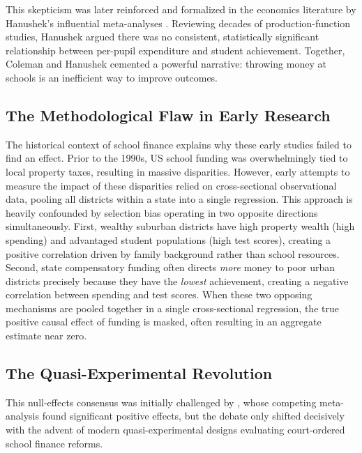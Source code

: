 \documentclass[12pt,letterpaper]{article}
\begin{document}
This skepticism was later reinforced and formalized in the economics literature by Hanushek's influential meta-analyses \citep{hanushek1997, hanushek2003}. Reviewing decades of production-function studies, Hanushek argued there was no consistent, statistically significant relationship between per-pupil expenditure and student achievement. Together, Coleman and Hanushek cemented a powerful narrative: throwing money at schools is an inefficient way to improve outcomes.

\subsection{The Methodological Flaw in Early Research}
The historical context of school finance explains why these early studies failed to find an effect. Prior to the 1990s, US school funding was overwhelmingly tied to local property taxes, resulting in massive disparities. However, early attempts to measure the impact of these disparities relied on cross-sectional observational data, pooling all districts within a state into a single regression. This approach is heavily confounded by selection bias operating in two opposite directions simultaneously. First, wealthy suburban districts have high property wealth (high spending) and advantaged student populations (high test scores), creating a positive correlation driven by family background rather than school resources. Second, state compensatory funding often directs \textit{more} money to poor urban districts precisely because they have the \textit{lowest} achievement, creating a negative correlation between spending and test scores. When these two opposing mechanisms are pooled together in a single cross-sectional regression, the true positive causal effect of funding is masked, often resulting in an aggregate estimate near zero.

\subsection{The Quasi-Experimental Revolution}
This null-effects consensus was initially challenged by \citet{greenwald1996}, whose competing meta-analysis found significant positive effects, but the debate only shifted decisively with the advent of modern quasi-experimental designs evaluating court-ordered school finance reforms.
\end{document}
